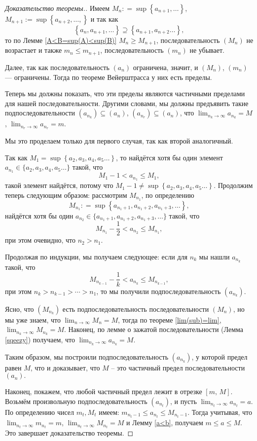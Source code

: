 \begin{proof}[Доказательство теоремы.] Имеем $M_n : = \sup\left\{a_{n+1}, \ldots \right\}$, $M_{n+1}:=\sup \left\{a_{n+2}, \ldots,\right\}$ и так как
\[
\left\{a_n, a_{n+1}, \ldots \right\} \supseteq \left\{a_{n+1}, a_{n+2} \ldots \right\},
\]
то по Лемме \ref{A<B=sup(A)<sup(B)} $M_n \ge M_{n+1}$, \ie последовательность $ (M_n )$ не возрастает и также $m_n \le m_{n+1}$, \ie последовательность $ (m_n )$ не убывает.

Далее, так как последовательность $ (a_n )$ ограничена, значит, и $ (M_n )$, $ (m_n )$ --- ограничены. Тогда по теореме Вейерштрасса у них есть пределы.

Теперь мы должны показать, что эти пределы являются частичными пределами для нашей последовательности. Другими словами, мы должны предъявить такие подпоследовательности $ (a_{n_k} ) \subseteq  (a_n )$, $ (a_{n_r} ) \subseteq  (a_n )$, что $\lim_{n_k \to \infty} a_{n_k} =M$, $\lim_{n_r \to \infty} a_{n_r} =m$.

Мы это проделаем только для первого случая, так как второй аналогичный.

Так как $M_1 = \sup \left\{a_2, a_3, a_4,a_5 \ldots\right\}$, то найдётся хотя бы один элемент $a_{n_1} \in \{a_2, a_3, a_4,a_5 \ldots\}$ такой, что 
\[
 M_1 -1< a_{n_1} \le M_1,
\]
такой элемент найдётся, потому что $M_1 -1 \ne \sup \left\{a_2, a_3, a_4,a_5 \ldots\right\}.$ Продолжим теперь следующим образом: рассмотрим $M_{n_1}$, по определению
\[
 M_{n_1}: = \sup \left\{a_{n_1 +1}, a_{n_1+2}, a_{n_1+3},\ldots\right\},
\]
найдётся хотя бы один $a_{n_2} \in \{a_{n_1 +1}, a_{n_1+2}, a_{n_1+3},\ldots\}$ такой, что 
\[
 M_{n_1}-\frac{1}{2} < a_{n_2} \le M_{n_1},
\]
при этом очевидно, что $n_2>n_1.$

Продолжая по индукции, мы получаем следующее: если для $n_k$ мы нашли $a_{n_k}$ такой, что
\[
 M_{n_{k-1}} - \frac{1}{k} < a_{n_{k}} \le M_{n_{k-1}},
\]
при этом $n_{k}>n_{k-1}> \cdots > n_1$, то мы получили подпоследовательность $ \left(a_{n_k} \right).$

Ясно, что $\left(M_{n_k} \right)$ есть подпоследовательность последовательности $\left(M_n\right)$, но мы уже знаем, что $\lim_{n\to \infty}M_n = M$, тогда по теореме \ref{lim(sub)=lim}, $\lim_{n_k\to \infty}M_{n_k} = M$. Наконец, по лемме о зажатой последовательности (Лемма \ref{sqeezy}) получаем, что $\lim_{n_k \to \infty}a_{n_k} = M.$

Таким образом, мы построили подпоследовательность $\left(a_{n_k}\right)$, у которой предел равен $M$, что и доказывает, что $M$ -- это частичный предел последовательности $\left(a_n\right).$

Наконец, покажем, что любой частичный предел лежит в отрезке $[m,\,M].$ Возьмём произвольную подпоследовательность $\left(a_{n_t}\right)$, и пусть $\lim_{n_t \to \infty}a_{n_{t}} = a$. По определению чисел $m_t, M_t$ имеем: $m_{n_{t}-1} \le a_{n_t} \le M_{n_t-1}$. Тогда учитывая, что $\lim_{n_t \to \infty} m_{n_t} = m$, $\lim_{n_t \to \infty}M_{n_t} = M$ и Лемму \ref{a<b}, получаем $m\le a \le M$. Это завершает доказательство теоремы.
\end{proof}